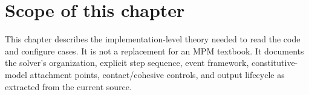 \section{Scope of this chapter}
This chapter describes the implementation-level theory needed to read the code and configure cases.  It is not a replacement for an MPM textbook.  It documents the solver's organization, explicit step sequence, event framework, constitutive-model attachment points, contact/cohesive controls, and output lifecycle as extracted from the current source.
